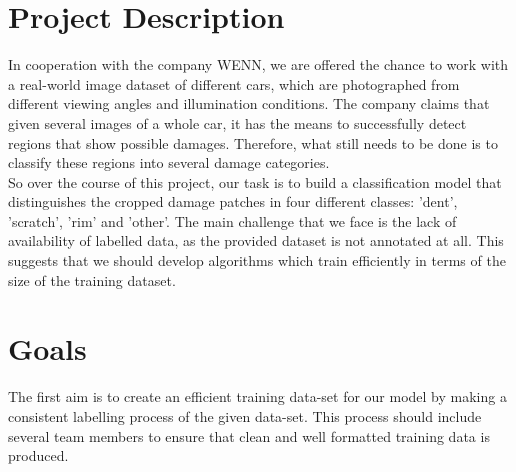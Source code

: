 \documentclass[lang=english,inputenc=utf8,fontsize=10pt]{ldvarticle}
\begin{document}
\section{Project Description}
In cooperation with the company WENN, we are offered the chance  to work with a real-world image dataset of different cars, which are photographed from different viewing angles and illumination conditions. The company claims that given several images of a whole car, it has the means to successfully detect regions that show possible damages. Therefore, what still needs to be done is to classify these regions into several damage categories.\\
So over the course of this project, our task is to build a classification model that distinguishes the cropped damage patches in four different classes: 'dent', 'scratch', 'rim' and 'other'. The main challenge that we face is the lack of availability of labelled data, as the provided dataset is not annotated at all. This suggests that we should develop algorithms which train efficiently in terms of the size of the training dataset.
\\
\begin{comment} 
-------------------------------------------------
WENN being a renowned company, from Netherlands, tackles different types of car related problems by offering us 4 different products. Among the four products - CarEye® Claim works with the images of car and detects the car damage. Having very few labelled data, they classify the car damage type with a machine learning model.
They make a video of coming cars from different angles and then from the video, they extract 60 images/sec. Thus they have a lot of images of the same car from different angles. After that they detect the region where some damage might be found. Later, they classify the damages into four classes (e.g. dent, scratch, rim damage or others). \newline

So our project is to develop a machine learning model which successfully classifies the damage type from the cropped images. The image format is 'jpeg' and 'webp'. We now have a data set from WENN that includes pictures of damage of four categories. But one of the challenging parts is that we don't have any labelled data and so at the end, we need to build an active learning model. 
\end{comment}

\section*{Goals}
The first aim is to create an efficient training data-set for our model by making a consistent labelling process of the given data-set. This process should include several team members to ensure that clean and well formatted training data is produced.\\
\end{document}
